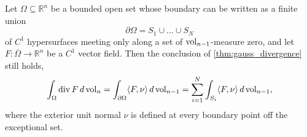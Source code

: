 \begin{theorem}
\label{thm:gauss_divergence_piecewise}
Let $\Omega \subseteq \mathbb{R}^n$ be a bounded open set whose boundary can be written as a
finite union
\[\partial\Omega = S_1 \cup \dots \cup S_N\]
of $C^1$ hypersurfaces meeting only along a set of $\operatorname{vol}_{n-1}$-measure zero, and let
$F : \overline\Omega \to \mathbb{R}^n$ be a $C^1$ vector field. Then the conclusion of
\cref{thm:gauss_divergence} still holds,
\[\int_\Omega \operatorname{div} F\,d\operatorname{vol}_n = \int_{\partial\Omega} \langle F,\nu\rangle\,d\operatorname{vol}_{n-1}
  = \sum_{i=1}^N \int_{S_i} \langle F,\nu\rangle\,d\operatorname{vol}_{n-1},\]
where the exterior unit normal $\nu$ is defined at every boundary point off the exceptional set.
\end{theorem}

